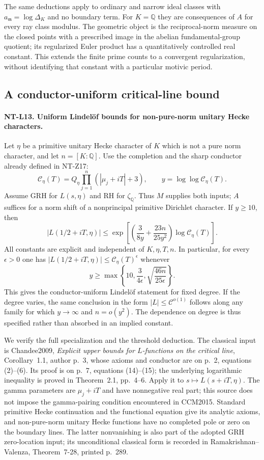 The same deductions apply to ordinary and narrow ideal classes
with $a_{\mathfrak m}=\log\Delta_K$ and no boundary term.
For $K=\mathbb Q$ they are consequences of $A$ for every ray
class modulus.  The geometric object is the reciprocal-norm
measure on the closed points with a prescribed image in the
abelian fundamental-group quotient; its regularized Euler
product has a quantitatively controlled real constant.
This extends the finite prime counts to a convergent
regularization, without identifying that constant with a
particular motivic period.

\subsection{A conductor-uniform critical-line bound}

\paragraph{NT-L13. Uniform Lindel\"of bounds for non-pure-norm unitary Hecke characters.}
Let $\eta$ be a primitive unitary Hecke character of $K$ which is
not a pure norm character, and let $n=[K:\mathbb Q]$.
Use the completion and the sharp conductor already defined in
NT-Z17:
\[
 \mathscr C_\eta(T)=Q_\eta
                  \prod_{j=1}^n(|\mu_j+iT|+3),
 \qquad y=\log\log\mathscr C_\eta(T).
\]
Assume GRH for $L(s,\eta)$ and RH for $\zeta_{\mathbb Q}$.
Thus $M$ supplies both inputs; $A$ suffices for a norm shift
of a nonprincipal primitive Dirichlet character.
If $y\ge10$, then
\[
 |L(1/2+iT,\eta)|\le
  \exp\left[
    \left(\frac3{8y}+\frac{23n}{25y^2}\right)
                      \log\mathscr C_\eta(T)\right].
\tag{NT-L13}
\]
All constants are explicit and independent of $K,\eta,T,n$.
In particular, for every $\epsilon>0$ one has
$|L(1/2+iT,\eta)|\le\mathscr C_\eta(T)^\epsilon$ whenever
\[
 y\ge\max\left\{10,\frac3{4\epsilon},
                         \sqrt{\frac{46n}{25\epsilon}}\right\}.
\tag{NT-L13-threshold}
\]
This gives the conductor-uniform Lindel\"of statement for fixed
degree.  If the degree varies, the same conclusion in the form
$|L|\le\mathscr C^{o(1)}$ follows along any family for which
$y\to\infty$ and $n=o(y^2)$.  The dependence on degree is thus
specified rather than absorbed in an implied constant.

We verify the full specialization and the threshold deduction.
The classical input is Chandee2009, \emph{Explicit upper bounds
for $L$-functions on the critical line}, Corollary~1.1,
author p.~3, whose axioms and conductor are on p.~2,
equations (2)--(6).  Its proof is on p.~7, equations
(14)--(15); the underlying logarithmic inequality is proved
in Theorem~2.1, pp.~4--6.
Apply it to $s\mapsto L(s+iT,\eta)$.
The gamma parameters are $\mu_j+iT$ and have nonnegative
real part; this source does not impose the gamma-pairing
condition encountered in CCM2015.  Standard primitive Hecke
continuation and the functional equation give its analytic
axioms, and non-pure-norm unitary Hecke functions have no
completed pole or zero on the boundary lines.  The latter
nonvanishing is also part of the adopted GRH zero-location
input; its unconditional classical form is recorded in
Ramakrishnan--Valenza, Theorem~7-28, printed p.~289.

